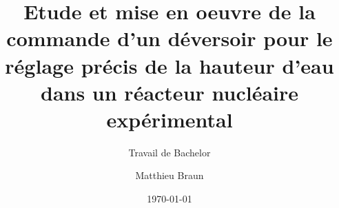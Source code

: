 \author{Matthieu Braun}


\title{Etude et mise en oeuvre de la commande d'un déversoir pour le réglage précis de la hauteur d'eau dans un réacteur nucléaire expérimental}

\subtitle{Travail de Bachelor}


\date{\today}


